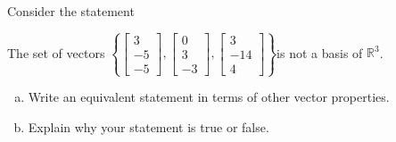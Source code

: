 
\begin{exerciseStatement}


Consider the statement 
\begin{center}\begin{minipage}{0.8\textwidth}
 The set of vectors \( \left\{ \left[\begin{array}{c}
3 \\
-5 \\
-5
\end{array}\right] , \left[\begin{array}{c}
0 \\
3 \\
-3
\end{array}\right] , \left[\begin{array}{c}
3 \\
-14 \\
4
\end{array}\right] \right\} \)is not a basis of \(\mathbb{R}^3\). 
\end{minipage}\end{center}
    


\begin{enumerate}[(a)]
\item  Write an equivalent statement in terms of other vector properties.
\item  Explain why your statement is true or false.
\end{enumerate}
    
\end{exerciseStatement}
    
